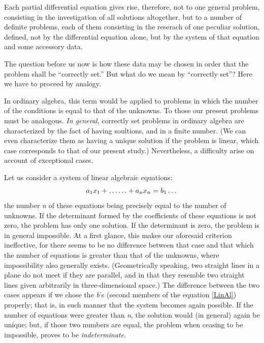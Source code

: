 \documentclass[12pt,oneside]{book}
\begin{document}
Each partial differential equation gives rise, therefore, not to one general problem,
consisting in the investigation of all solutions altogether, but to a number of definite problems,
each of them consisting in the reserach of one peculiar solution, defined, not by the differential equation alone,
but by the system of that equation and some accessory data. \par

The question before us now is how these data may be chosen in order that the problem shall be ``correctly set.''
But what do we mean by ``correctly set''? Here we have to proceed by analogy. \par

In ordinary algebra, this term would be applied to problems in which the number of the conditions is equal to that
of the unknowns. To those our present problems must be analogous. \textit{In general}, correctly set problems in
ordinary algebra are characterized by the fact of having soultions, and in a finite number. (We can even characterize
them as having a unique solution if the problem is linear, which case corresponds to that of our present study.)
Nevertheless, a difficulty arise on account of exceptional cases. \par

Let us consider a system of linear algebraic equations:
\begin{equation}
    \label{LinAl}
    a_1x_1 + \dots\ldots + a_nx_n = b_1\ldots \\
\end{equation}
the number \textit{n} of these equations being precisely equal to the number of unknowns.
If the determinant formed by the coefficients of these equations is not zero, the problem has only one solution.
If the determinant is zero, the problem is in general impossible. At a first glance, this makes our aforesaid
criterion ineffective, for there seems to be no difference between that case and that which the number of equations
is greater than that of the unknowns, where impossibility also generally exists. (Geometrically speaking, two straight
lines in a plane do not meet if they are parallel, and in that they resemble two straight lines given arbitrarily
in three-dimensional space.) The difference between the two cases appears if we chose the \textit{b}'s (second
members of the equation \ref{LinAl}) properly; that is, in such manner that the system becomes again possible.
If the number of equations were greater than \textit{n}, the solution would (in general) again be unique; but,
if those two numbers are equal, the problem when ceasing to be impossible, proves to be \textit{indeterminate}. \par
\end{document}
